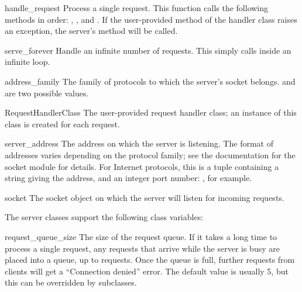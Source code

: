\begin{funcdesc}{handle_request}{}
Process a single request.  This function calls the following methods
in order: , , and
.  If the user-provided  method
of the handler class raises an exception, the server's
 method will be called.
\end{funcdesc}

\begin{funcdesc}{serve_forever}{}
Handle an infinite number of requests.  This simply calls
 inside an infinite loop.
\end{funcdesc}

\begin{datadesc}{address_family}
The family of protocols to which the server's socket belongs.
 and  are two possible values.
\end{datadesc}

\begin{datadesc}{RequestHandlerClass}
The user-provided request handler class; an instance of this class is
created for each request.
\end{datadesc}

\begin{datadesc}{server_address}
The address on which the server is listening.  The format of addresses
varies depending on the protocol family; see the documentation for the
socket module for details.  For Internet protocols, this is a tuple
containing a string giving the address, and an integer port number:
, for example.
\end{datadesc}

\begin{datadesc}{socket}
The socket object on which the server will listen for incoming requests.
\end{datadesc}


The server classes support the following class variables:

\begin{datadesc}{request_queue_size}
The size of the request queue.  If it takes a long time to process a
single request, any requests that arrive while the server is busy are
placed into a queue, up to  requests.  Once
the queue is full, further requests from clients will get a
``Connection denied'' error.  The default value is usually 5, but this
can be overridden by subclasses.
\end{datadesc}

